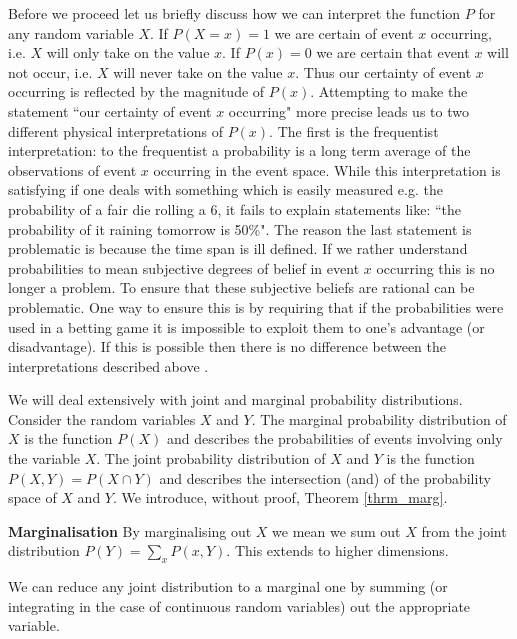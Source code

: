 Before we proceed let us briefly discuss how we can interpret the function $P$ for any random variable $X$. If $P(X=x)=1$ we are certain of event $x$ occurring, i.e. $X$ will only take on the value $x$. If $P(x)=0$ we are certain that event $x$ will not occur, i.e. $X$ will never take on the value $x$. Thus our certainty of event $x$ occurring is reflected by the magnitude of $P(x)$. Attempting to make the statement ``our certainty of event $x$ occurring" more precise leads us to two different physical interpretations of $P(x)$. The first is the frequentist interpretation: to the frequentist a probability is a long term average of the observations of event $x$ occurring in the event space. While this interpretation is satisfying if one deals with something which is easily measured e.g. the probability of a fair die rolling a 6, it fails to explain statements like: ``the probability of it raining tomorrow is 50\%". The reason the last statement is problematic is because the time span is ill defined. If we rather understand probabilities to mean subjective degrees of belief in event $x$ occurring this is no longer a problem. To ensure that these subjective beliefs are rational can be problematic. One way to ensure this is by requiring that if the probabilities were used in a betting game it is impossible to exploit them to one's advantage (or disadvantage). If this is possible then there is no difference between the interpretations described above \cite{koller}. 

We will deal extensively with joint and marginal probability distributions. Consider the random variables $X$ and $Y$. The marginal probability distribution of $X$ is the function $P(X)$ and describes the probabilities of events involving only the variable $X$. The joint probability distribution of $X$ and $Y$ is the function $P(X,Y) = P(X \cap Y)$ and describes the intersection (and) of the probability space of $X$ and $Y$. We introduce, without proof, Theorem \ref{thrm_marg}.
\begin{thrm}
\textbf{Marginalisation} By marginalising out $X$ we mean we sum out $X$ from the joint distribution $P(Y) = \sum_x P(x, Y)$. This extends to higher dimensions. 
\label{thrm_marg}
\end{thrm}
We can reduce any joint distribution to a marginal one by summing (or integrating in the case of continuous random variables) out the appropriate variable. 

